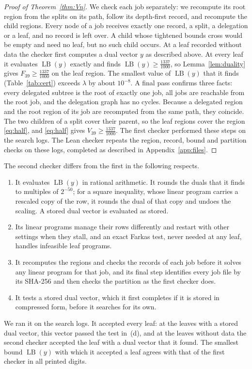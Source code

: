 \documentclass[11pt]{amsart}
\theoremstyle{definition}
\theoremstyle{remark}
\numberwithin{equation}{section}
\newcommand{\LB}{\operatorname{LB}}
\newcommand{\LAM}{\tfrac{1337}{1000}}
\newcommand{\Nbins}{39}
\newcommand{\MinLeafGap}{10^{-8}}
\begin{document}
\begin{proof}[Proof of Theorem~\ref{thm:Vn}]
We check each job separately: we recompute its root region from the splits on its path, follow its depth-first record, and recompute the child regions. Every node of a job receives exactly one record, a split, a delegation or a leaf, and no record is left over. A child whose tightened bounds cross would be empty and need no leaf, but no such child occurs. At a leaf recorded without data the checker first computes a dual vector $y$ as described above. At every leaf it evaluates $\LB(y)$ exactly and finds $\LB(y)\ge\LAM$, so Lemma~\ref{lem:duality} gives $F_{\Nbins}\ge\LAM$ on the leaf region. The smallest value of $\LB(y)$ that it finds (Table~\ref{tab:cert}) exceeds $\lambda$ by about $\MinLeafGap$. A final pass confirms three facts: every delegated subtree is the root of exactly one job, all jobs are reachable from the root job, and the delegation graph has no cycles. Because a delegated region and the root region of its job are recomputed from the same path, they coincide. The two children of a split cover their parent, so the leaf regions cover the region \eqref{eq:half}, and \eqref{eq:half} gives $V_{\Nbins}\ge\LAM$. The first checker performed these steps on the search logs. The Lean checker repeats the region, record, bound and partition checks on these logs, completed as described in Appendix~\ref{app:files}.
\end{proof}

The second checker differs from the first in the following respects.
\begin{enumerate}[label=(\alph*)]
\item It evaluates $\LB(y)$ in rational arithmetic. It rounds the duals that it finds to multiples of $2^{-50}$; for a square inequality, whose linear program carries a rescaled copy of the row, it rounds the dual of that copy and undoes the scaling. A stored dual vector is evaluated as stored.
\item Its linear programs manage their rows differently and restart with other settings when they stall, and an exact Farkas test, never needed at any leaf, handles infeasible leaf programs.
\item It recomputes the regions and checks the records of each job before it solves any linear program for that job, and its final step identifies every job file by its SHA-256 and then checks the partition as the first checker does.
\item It tests a stored dual vector, which it first completes if it is stored in compressed form, before it searches for its own.
\end{enumerate}
We ran it on the search logs. It accepted every leaf: at the leaves with a stored dual vector, this vector passed the test in~(d), and at the leaves without data the second checker accepted the leaf with a dual vector that it found. The smallest bound $\LB(y)$ with which it accepted a leaf agrees with that of the first checker in all printed digits.
\end{document}
